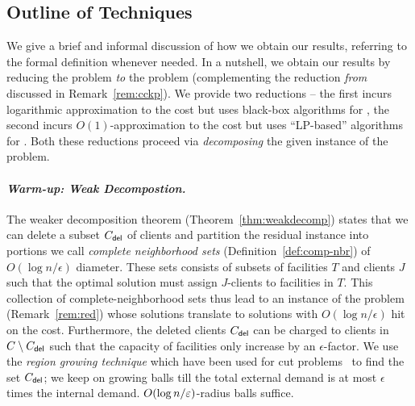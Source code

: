%
%

\subsection{Outline of Techniques} \label{sec:overview}
We give a brief and informal discussion of how we obtain our results, referring to the formal definition whenever needed.
In a nutshell, we obtain our results by reducing the \mckc problem {\em to} the \cckp problem (complementing the reduction {\em from} discussed in Remark~\ref{rem:cckp}).
We provide two reductions -- the first incurs logarithmic approximation to the cost but uses black-box algorithms for \cckp, the second incurs $O(1)$-approximation to the cost but uses ``LP-based'' algorithms for \cckp.
Both these reductions proceed via {\em decomposing} the given instance of the \mckc problem. %

\paragraph{\emph{Warm-up: Weak Decompostion.}}
The weaker decomposition theorem (Theorem~\ref{thm:weakdecomp}) states that we can delete a subset $C_{\mathsf{del}}$ of clients and partition the residual instance into portions we call {\em complete neighborhood sets} (Definition~\ref{def:comp-nbr}) of $O(\log n/\epsilon)$ diameter.
These sets consists of subsets of facilities $T$ and clients $J$ such that the optimal solution must assign $J$-clients to facilities in $T$. This collection of complete-neighborhood sets thus lead to an instance of the \cckp problem (Remark~\ref{rem:red})
whose solutions translate to \mckc solutions with $O(\log n/\epsilon)$ hit on the cost. Furthermore, the deleted clients $C_{\mathsf{del}}$ can be charged to clients in $C\setminus C_{\mathsf{del}}$ such that the capacity of facilities only increase by an $\epsilon$-factor.
We use the {\em region growing technique} which have been used for cut problems~\cite{LeightonR99, GargVY96} to find the set $C_{\mathsf{del}}$; we keep on growing balls till the total external demand is at most $\epsilon$ times the internal demand.
$O(\log n/\varepsilon)$-radius balls suffice. %

